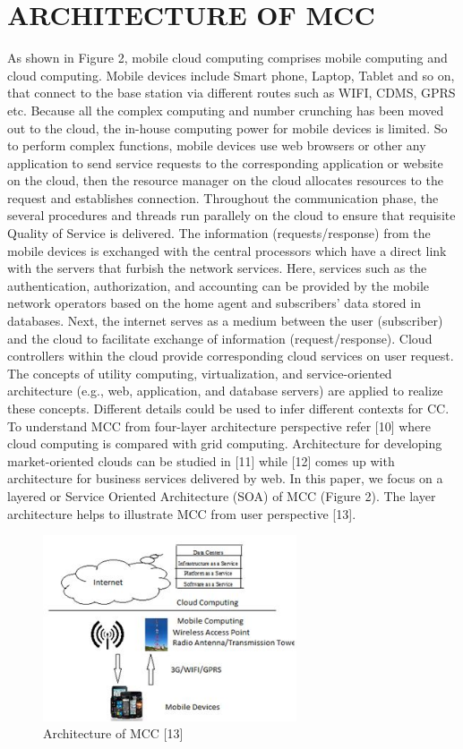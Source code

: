 \documentclass[10pt, conference, compsocconf]{IEEEtran}
\begin{document}
\section{ARCHITECTURE OF MCC}
As shown in Figure 2, mobile cloud computing comprises mobile computing and cloud computing. Mobile devices include Smart phone, Laptop, Tablet and so on, that connect to the base station via different routes such as WIFI, CDMS, GPRS etc. Because all the complex computing and number crunching has been moved out to the cloud, the in-house computing power for mobile devices is limited. So to perform complex functions, mobile devices use web browsers or other any application to send service requests to the corresponding application or website on the cloud, then the resource manager on the cloud allocates resources to the request and establishes connection. Throughout the communication phase, the several procedures and threads run parallely on the cloud to ensure that requisite Quality of Service is delivered. The information (requests/response) from the mobile devices is exchanged with the central processors which have a direct link with the servers that furbish the network services. Here, services such as the authentication, authorization, and accounting can be provided by the mobile network operators based on the home agent and subscribers’ data stored in databases. Next, the internet serves as a medium between the user (subscriber) and the cloud to facilitate exchange of information (request/response). Cloud controllers within the cloud provide corresponding cloud services on user request. The concepts of utility computing, virtualization, and service-oriented architecture (e.g., web, application, and database servers) are applied to realize these concepts. Different details could be used to infer different contexts for CC. To understand MCC from four-layer architecture perspective refer [10] where cloud computing is compared with grid computing. Architecture for developing market-oriented clouds can be studied in [11] while [12] comes up with architecture for business services delivered by web. In this paper, we focus on a layered or Service Oriented Architecture (SOA) of MCC (Figure 2). The layer architecture helps to illustrate MCC from user perspective [13].

\begin{figure}[h!]
\begin{center}
    \includegraphics[scale=1,width=75mm]{fig2ver2}
\end{center}
\caption{Architecture of MCC [13]}
\end{figure}
\end{document}

